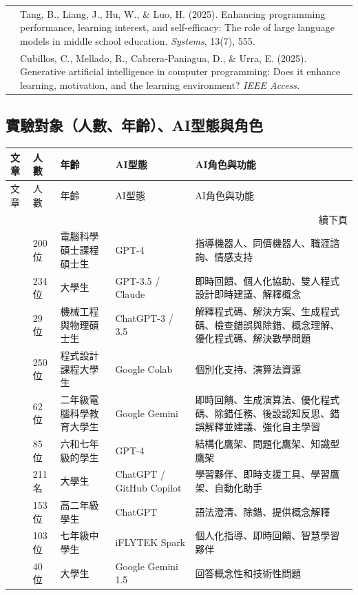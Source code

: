\begin{longtable}{p{} p{}}
\cite{tang2025enhancing} & Tang, B., Liang, J., Hu, W., \& Luo, H. (2025). Enhancing programming performance, learning interest, and self-efficacy: The role of large language models in middle school education. \textit{Systems}, 13(7), 555. \\
\cite{cubillos2025generative} & Cubillos, C., Mellado, R., Cabrera-Paniagua, D., \& Urra, E. (2025). Generative artificial intelligence in computer programming: Does it enhance learning, motivation, and the learning environment? \textit{IEEE Access.} \\
\end{longtable}

\subsection{實驗對象（人數、年齡）、AI型態與角色}\label{sec:實驗對象}

\begin{longtable}{p{} p{} p{} p{} p{}}
\toprule
文章 & 人數 & 年齡 & AI型態 & AI角色與功能 \\
\midrule
\endfirsthead
\toprule
文章 & 人數 & 年齡 & AI型態 & AI角色與功能 \\
\midrule
\endhead
\midrule
\multicolumn{5}{r}{續下頁} \\
\endfoot
\bottomrule
\endlastfoot
\cite{cao2023chatbots} & 200位 & 電腦科學碩士課程碩士生 & GPT-4 & 指導機器人、同儕機器人、職涯諮詢、情感支持 \\
\cite{fan2025pair} & 234位 & 大學生 & GPT-3.5 / Claude & 即時回饋、個人化協助、雙人程式設計即時建議、解釋概念 \\
\cite{groothuijsen2024chatbots} & 29位 & 機械工程與物理碩士生 & ChatGPT-3 / 3.5 & 解釋程式碼、解決方案、生成程式碼、檢查錯誤與除錯、概念理解、優化程式碼、解決數學問題 \\
\cite{llerena2024introductory} & 250位 & 程式設計課程大學生 & Google Colab & 個別化支持、演算法資源 \\
\cite{omeh2025pbl} & 62位 & 二年級電腦科學教育大學生 & Google Gemini & 即時回饋、生成演算法、優化程式碼、除錯任務、後設認知反思、錯誤解釋並建議、強化自主學習 \\
\cite{yan2025llm} & 85位 & 六和七年級的學生 & GPT-4 & 結構化鷹架、問題化鷹架、知識型鷹架 \\
\cite{kohen2025integrating} & 211名 & 大學生 & ChatGPT / GitHub Copilot & 學習夥伴、即時支援工具、學習鷹架、自動化助手 \\
\cite{yang2025chatgpt} & 153位 & 高二年級學生 & ChatGPT & 語法澄清、除錯、提供概念解釋 \\
\cite{tang2025enhancing} & 103位 & 七年級中學生 & iFLYTEK Spark & 個人化指導、即時回饋、智慧學習夥伴 \\
\cite{cubillos2025generative} & 40位 & 大學生 & Google Gemini 1.5 & 回答概念性和技術性問題 \\
\end{longtable}

